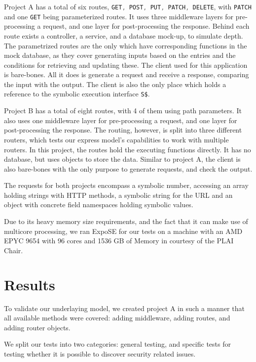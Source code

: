 Project A has a total of six routes, \lstinline[language=JavaScript]+GET, POST, PUT, PATCH, DELETE+, with \lstinline[language=JavaScript]+PATCH+ and one \lstinline[language=JavaScript]+GET+ 
being parameterized routes. It uses three middleware layers for pre-processing a request, and one layer for post-processing the response. Behind each route exists a controller, a service, and a database mock-up, to simulate depth. The parametrized routes are the only which have corresponding functions in the mock database, as they cover generating inputs based on the entries and the conditions for retrieving and updating these. The client used for this application is bare-bones. All it does is generate a request and receive a response, comparing the input with the output. The client is also the only place which holds a reference to the symbolic execution interface 
\lstinline[language=JavaScript]{S$}. 

Project B has a total of eight routes, with 4 of them using path parameters.
It also uses one middleware layer for pre-processing a request, and one layer for post-processing the response. The routing, however, is split into three different routers, which tests our express model's capabilities to work with multiple routers. In this project, the routes hold the executing functions directly. It has no database, but uses objects to store the data. Similar to project A, the client is also bare-bones with the only purpose to generate requests, and check the output. 

The requests for both projects encompass a symbolic number, accessing an array holding strings with HTTP methods, a symbolic string for the URL and an object with concrete field namespaces holding symbolic values.


Due to its heavy memory size requirements, and the fact that it can make use of multicore processing, we ran ExpoSE for our tests on a machine with an AMD EPYC 9654 with 96 cores and 1536 GB of Memory in courtesy of the PLAI Chair.


\section{Results}
\label{sec:results}

To validate our underlaying model, we created project A in such a manner that all available methods were covered: adding middleware, adding routes, and adding router objects.

We split our tests into two categories: general testing, and specific tests for testing whether it is possible to discover security related issues.



